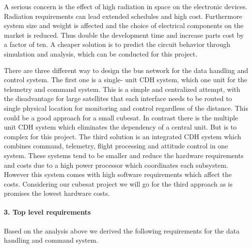  A serious concern is the effect of high radiation in space on the electronic devices. Radiation requirements can lead extended schedules and high cost. Furthermore system size and weight is affected and the choice of electrical components on the market is reduced. Thus double the development time and increase parts cost by a factor of ten. A cheaper solution is to predict the circuit behavior through simulation and analysis, which can be conducted for this project.

There are three different way to design the bus network for the data handling
and control system. The first one is a single- unit CDH system, which one unit
for the telemetry and command system. This is a simple and centralized attempt,
with the disadvantage for large satellites that each interface needs to be routed
to single physical location for monitoring and control regardless of the distance.
This could be a good approach for a small cubesat. In contrast there is the multiple
unit CDH system which eliminates the dependency of a central unit. But is to
complex for this project. The third solution is an integrated CDH system which
combines command, telemetry, flight processing and attitude control in one system.
These systems tend to be smaller and reduce the hardware requirements and costs due
to a high power processor which coordinates each subsystem. However this system
comes with high software requirements which affect the costs. Considering our
cubesat project we will go for the third approach as is promises the lowest hardware costs.

\paragraph{3. Top level requirements}
Based on the analysis above we derived the following requirements for the data handling and command system.

